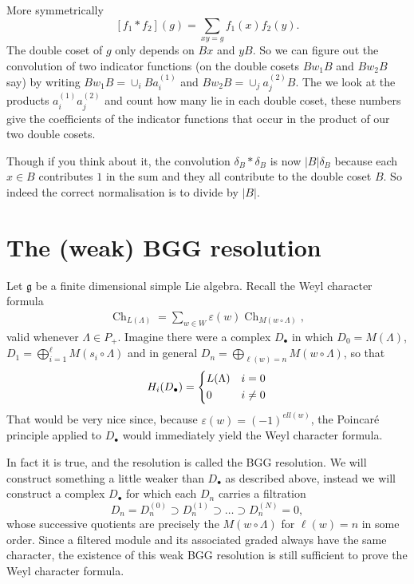 \documentclass[12pt]{article}
\theoremstyle{plain}
\theoremstyle{definition}
\numberwithin{equation}{section}
\DeclareMathOperator{\ch}{Ch}
\newcommand{\La}{\Lambda}
\newcommand{\g}{\mathfrak{g}}
\begin{document}
More symmetrically
\[
[f_1 * f_2](g) = \sum_{xy = g} f_1(x) f_2(y).
\]
The double coset of $g$ only depends on $Bx$ and $yB$. So we can figure out the convolution of two indicator functions (on the double cosets $Bw_1B$ and $Bw_2B$ say) by writing $Bw_1B = \cup_i Ba^{(1)}_i$ and $Bw_2B = \cup_j a^{(2)}_jB$. The we look at the products $a^{(1)}_i a^{(2)}_j$ and count how many lie in each double coset, these numbers give the coefficients of the indicator functions that occur in the product of our two double cosets.

Though if you think about it, the convolution $\delta_B * \delta_B$ is now $|B| \delta_B$ because each $x \in B$ contributes $1$ in the sum and they all contribute to the double coset $B$. So indeed the correct normalisation is to divide by $|B|$.

















\section{The (weak) BGG resolution}


Let $\g$ be a finite dimensional simple Lie algebra. Recall the Weyl character formula
\begin{align*}
\ch_{L(\La)} = \sum_{w \in W} \varepsilon(w) \ch_{M(w \circ \La)},
\end{align*}
valid whenever $\La \in P_+$. Imagine there were a complex $D_\bullet$ in which $D_0 = M(\La)$, $D_1 = \bigoplus_{i=1}^\ell M(s_i \circ \La)$ and in general $D_n = \bigoplus_{\ell(w)=n} M(w \circ \La)$, so that
\begin{align*}
H_i(D_\bullet) = \begin{dcases}
L(\La) & i=0 \\
0 & i \neq 0
\end{dcases}
\end{align*}
That would be very nice since, because $\varepsilon(w) = (-1)^{ell(w)}$, the Poincaré principle applied to $D_\bullet$ would immediately yield the Weyl character formula.

In fact it is true, and the resolution is called the BGG resolution. We will construct something a little weaker than $D_\bullet$ as described above, instead we will construct a complex $D_\bullet$ for which each $D_n$ carries a filtration
\[
D_n = D_n^{(0)} \supset D_n^{(1)} \supset \ldots \supset D_n^{(N)} = 0,
\]
whose successive quotients are precisely the $M(w \circ \La)$ for $\ell(w)=n$ in some order. Since a filtered module and its associated graded always have the same character, the existence of this weak BGG resolution is still sufficient to prove the Weyl character formula.
\end{document}
